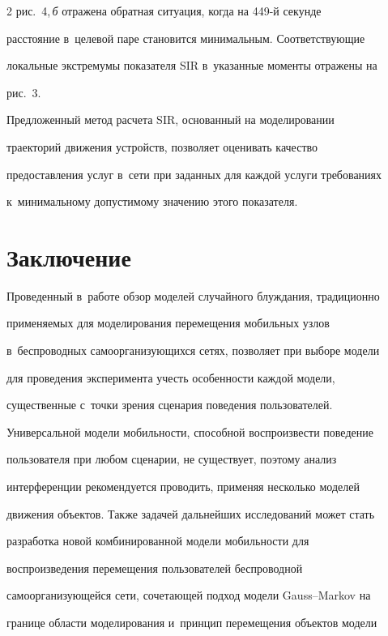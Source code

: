 \begin{multicols}{2}
рис.~4,\,\textit{б} отражена обратная ситуация, когда на 449-й секунде 

расстояние в~целевой паре становится минимальным. Соответствующие 

локальные экстремумы показателя SIR в~указанные моменты отражены на 

рис.~3.

  

  

  Предложенный метод расчета SIR, основанный на моделировании 

траекторий движения устройств, поз\-во\-ля\-ет оценивать качество 

предо\-став\-ле\-ния услуг в~сети при заданных для каждой услуги требованиях 

к~минимальному допустимому значению этого показателя.



\section{Заключение}



  Проведенный в~работе обзор моделей случайного блуж\-да\-ния, традиционно 

применяемых для моделирования перемещения мобильных узлов 

в~беспроводных са\-мо\-ор\-га\-ни\-зу\-ющих\-ся сетях, поз\-во\-ля\-ет при выборе модели 

для проведения эксперимента учесть особенности каж\-дой модели, 

существенные с~точ\-ки зрения сценария поведения пользователей. 

Универсальной модели мо\-биль\-ности, способной воспроизвести поведение 

пользователя при любом сценарии, не существует, поэтому анализ 

интерференции рекомендуется проводить, применяя несколько моделей 

движения объектов. Также задачей дальнейших исследований может стать 

разработка новой комбинированной модели мо\-биль\-ности для 

воспроизведения перемещения пользователей беспроводной 

самоорганизующейся сети, сочетающей подход модели Gauss--Markov на 

границе об\-ласти моделирования и~принцип перемещения объектов модели 


\end{multicols}
